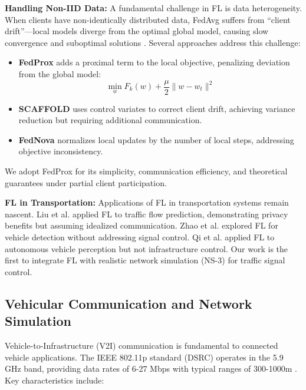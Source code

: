 \documentclass[conference]{IEEEtran}
\begin{document}
\textbf{Handling Non-IID Data:} A fundamental challenge in FL is data heterogeneity. When clients have non-identically distributed data, FedAvg suffers from ``client drift''---local models diverge from the optimal global model, causing slow convergence and suboptimal solutions \cite{karimireddy2020scaffold}. Several approaches address this challenge:

\begin{itemize}
    \item \textbf{FedProx} \cite{li2020fedprox} adds a proximal term to the local objective, penalizing deviation from the global model:
    \begin{equation}
    \min_w F_k(w) + \frac{\mu}{2} \|w - w_t\|^2
    \end{equation}

    \item \textbf{SCAFFOLD} \cite{karimireddy2020scaffold} uses control variates to correct client drift, achieving variance reduction but requiring additional communication.

    \item \textbf{FedNova} \cite{wang2020fednova} normalizes local updates by the number of local steps, addressing objective inconsistency.
\end{itemize}

We adopt FedProx for its simplicity, communication efficiency, and theoretical guarantees under partial client participation.

\textbf{FL in Transportation:} Applications of FL in transportation systems remain nascent. Liu et al. \cite{liu2020federated} applied FL to traffic flow prediction, demonstrating privacy benefits but assuming idealized communication. Zhao et al. \cite{zhao2021} explored FL for vehicle detection without addressing signal control. Qi et al. \cite{qi2021federated} applied FL to autonomous vehicle perception but not infrastructure control. Our work is the first to integrate FL with realistic network simulation (NS-3) for traffic signal control.

\subsection{Vehicular Communication and Network Simulation}
Vehicle-to-Infrastructure (V2I) communication is fundamental to connected vehicle applications. The IEEE 802.11p standard (DSRC) operates in the 5.9 GHz band, providing data rates of 6-27 Mbps with typical ranges of 300-1000m \cite{kenney2011dsrc}. Key characteristics include:
\end{document}
